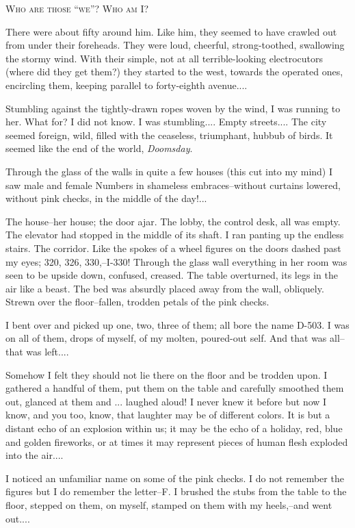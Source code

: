 \documentclass[11pt,openany]{book}
\begin{document}
\begin{center}\textsc{Who are those ``we''? Who am I?}\end{center}

There were about fifty around him. Like him, they seemed to have crawled out from under their foreheads. They were loud, cheerful, strong-toothed, swallowing the stormy wind. With their simple, not at all terrible-looking electrocutors (where did they get them?) they started to the west, towards the operated ones, encircling them, keeping parallel to forty-eighth avenue....

Stumbling against the tightly-drawn ropes woven by the wind, I was running to her. What for? I did not know. I was stumbling.... Empty streets.... The city seemed foreign, wild, filled with the ceaseless, triumphant, hubbub of birds. It seemed like the end of the world, \emph{Doomsday}.

Through the glass of the walls in quite a few houses (this cut into my mind) I saw male and female Numbers in shameless embraces--without curtains lowered, without pink checks, in the middle of the day!...

The house--her house; the door ajar. The lobby, the control desk, all was empty. The elevator had stopped in the middle of its shaft. I ran panting up the endless stairs. The corridor. Like the spokes of a wheel figures on the doors dashed past my eyes; 320, 326, 330,--I-330! Through the glass wall everything in her room was seen to be upside down, confused, creased. The table overturned, its legs in the air like a beast. The bed was absurdly placed away from the wall, obliquely. Strewn over the floor--fallen, trodden petals of the pink checks.

I bent over and picked up one, two, three of them; all bore the name D-503. I was on all of them, drops of myself, of my molten, poured-out self. And that was all--that was left....

Somehow I felt they should not lie there on the floor and be trodden upon. I gathered a handful of them, put them on the table and carefully smoothed them out, glanced at them and ... laughed aloud! I never knew it before but now I know, and you too, know, that laughter may be of different colors. It is but a distant echo of an explosion within us; it may be the echo of a holiday, red, blue and golden fireworks, or at times it may represent pieces of human flesh exploded into the air....

I noticed an unfamiliar name on some of the pink checks. I do not remember the figures but I do remember the letter--F. I brushed the stubs from the table to the floor, stepped on them, on myself, stamped on them with my heels,--and went out....
\end{document}
